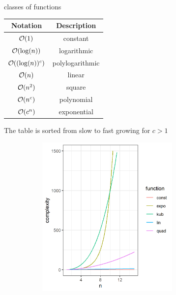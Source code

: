 \documentclass[11pt,compress,t,notes=noshow, xcolor=table]{beamer}
\begin{document}
\begin{vbframe}{classes of functions}

\begin{center}
  \begin{tabular}{ c | c}
  Notation & Description \\
  \hline
  $\mathcal{O}(1)$ & constant \\
  $\mathcal{O}(\log(n))$ & logarithmic \\
  $\mathcal{O}((\log(n))^c)$ & polylogarithmic \\
  $\mathcal{O}(n)$ & linear \\
  $\mathcal{O}(n^2)$ & square \\
  $\mathcal{O}(n^c)$ & polynomial \\
  $\mathcal{O}(c^n)$ & exponential
  \end{tabular}
\end{center}

The table is sorted from slow to fast growing for $c > 1$

\framebreak

\lz

\begin{center}
\begin{figure}
  \includegraphics[height = 8cm, width = 9cm]{figure_man/classes.png}
\end{figure}
\end{center}

\end{vbframe}

\endlecture
\end{document}
